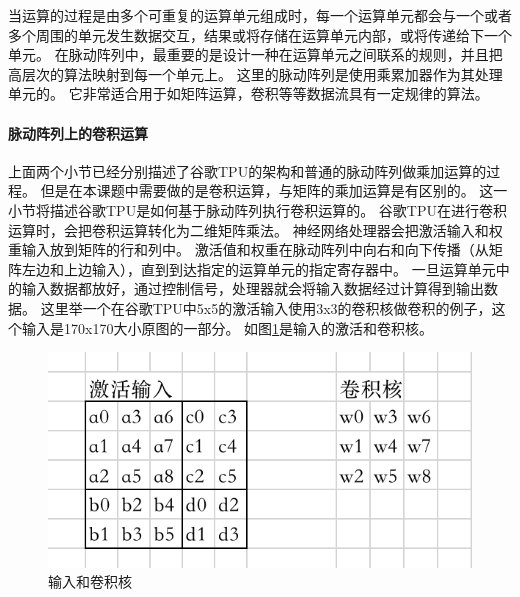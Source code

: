 当运算的过程是由多个可重复的运算单元组成时，每一个运算单元都会与一个或者多个周围的单元发生数据交互，结果或将存储在运算单元内部，或将传递给下一个单元。
在脉动阵列中，最重要的是设计一种在运算单元之间联系的规则，并且把高层次的算法映射到每一个单元上。
这里的脉动阵列是使用乘累加器作为其处理单元的。
它非常适合用于如矩阵运算，卷积等等数据流具有一定规律的算法。  

\paragraph{脉动阵列上的卷积运算}
上面两个小节已经分别描述了谷歌TPU\cite{2017In}的架构和普通的脉动阵列做乘加运算的过程。
但是在本课题中需要做的是卷积运算，与矩阵的乘加运算是有区别的。
这一小节将描述谷歌TPU是如何基于脉动阵列执行卷积运算的。
谷歌TPU\cite{2017In}在进行卷积运算时，会把卷积运算转化为二维矩阵乘法。
神经网络处理器会把激活输入和权重输入放到矩阵的行和列中。
激活值和权重在脉动阵列中向右和向下传播（从矩阵左边和上边输入），直到到达指定的运算单元的指定寄存器中。
一旦运算单元中的输入数据都放好，通过控制信号，处理器就会将输入数据经过计算得到输出数据。
这里举一个在谷歌TPU中5x5的激活输入使用3x3的卷积核做卷积的例子，这个输入是170x170大小原图的一部分\cite{2017Rotating}。
如图\ref{fig:activation_and_kernel}是输入的激活和卷积核。
\begin{figure}[htbp]
    \centering
    \includegraphics[]{figures/activation_and_kernel.png}
    \caption{输入和卷积核}
    \label{fig:activation_and_kernel}
\end{figure} 

